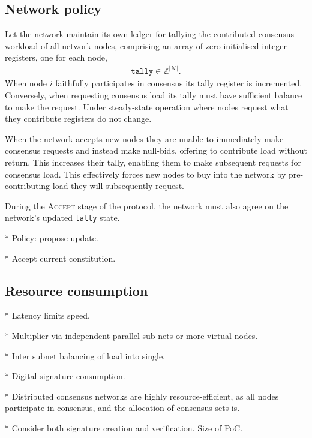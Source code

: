 \subsection{Network policy}

Let the network maintain its own ledger for tallying the contributed consensus workload of all network nodes, comprising an array of zero-initialised integer registers, one for each node,
\begin{align}
	\mathtt{tally}\in\mathbb{Z}^{|\mathcal{N}|}.
\end{align}
When node $i$ faithfully participates in consensus its tally register is incremented. Conversely, when requesting consensus load its tally must have sufficient balance to make the request. Under steady-state operation where nodes request what they contribute registers do not change.

When the network accepts new nodes they are unable to immediately make consensus requests and instead make null-bids, offering to contribute load without return. This increases their tally, enabling them to make subsequent requests for consensus load. This effectively forces new nodes to buy into the network by pre-contributing load they will subsequently request.

During the \textsc{Accept} stage of the protocol, the network must also agree on the network's updated \texttt{tally} state.

* Policy: propose update.

* Accept current constitution.



\subsection{Resource consumption}

* Latency limits speed.

* Multiplier via independent parallel sub nets or more virtual nodes.

* Inter subnet balancing of load into single.

* Digital signature consumption.

* Distributed consensus networks are highly resource-efficient, as all nodes participate in consensus, and the allocation of consensus sets is.

* Consider both signature creation and verification. Size of PoC.